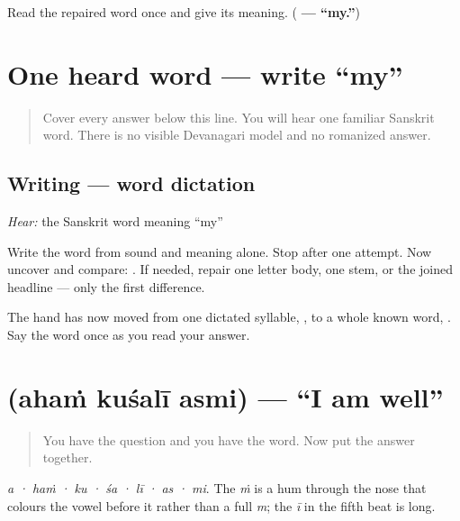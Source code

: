 \begin{tcolorbox}[breakable,colback=teal!4,colframe=teal!35!black,title={Before you move on}]
Read the repaired word once and give its meaning. (\textbf{ — “my.”})
\end{tcolorbox}
\section[\texorpdfstring{\sk{मम} (mama)}{मम (mama)}]{One heard word — write “my”}

\label{lesson:SA-W03-mama-dictation}



\begin{quote}
Cover every answer below this line. You will hear one familiar Sanskrit word. There is no visible Devanagari model and no romanized answer.
\end{quote}

\subsection*{Writing — word dictation}
\emph{Hear:} the Sanskrit word meaning “my”

Write the word from sound and meaning alone. Stop after one attempt. Now uncover and compare: \textbf{}. If needed, repair one letter body, one stem, or the joined headline — only the first difference.

\begin{tcolorbox}[breakable,colback=teal!4,colframe=teal!35!black,title={Before you move on}]
The hand has now moved from one dictated syllable, \textbf{}, to a whole known word, \textbf{}. Say the word once as you read your answer.
\end{tcolorbox}
\section[\texorpdfstring{\sk{अहं} \sk{कुशली} \sk{अस्मि} (ahaṁ kuśalī asmi)}{अहं कुशली अस्मि (ahaṁ kuśalī asmi)}]{   (ahaṁ kuśalī asmi) — \textquotedblleft{}I am well\textquotedblright{}}

\label{lesson:SA-C03-kushali-asmi}



\begin{quote}
You have the question and you have the word. Now put the answer together.
\end{quote}

\begin{sounds}
\emph{a · haṁ · ku · śa · lī · as · mi}. The \emph{ṁ} is a hum through the nose that colours the vowel before it rather than a full \emph{m}; the \emph{ī} in the fifth beat is long.
\end{sounds}

